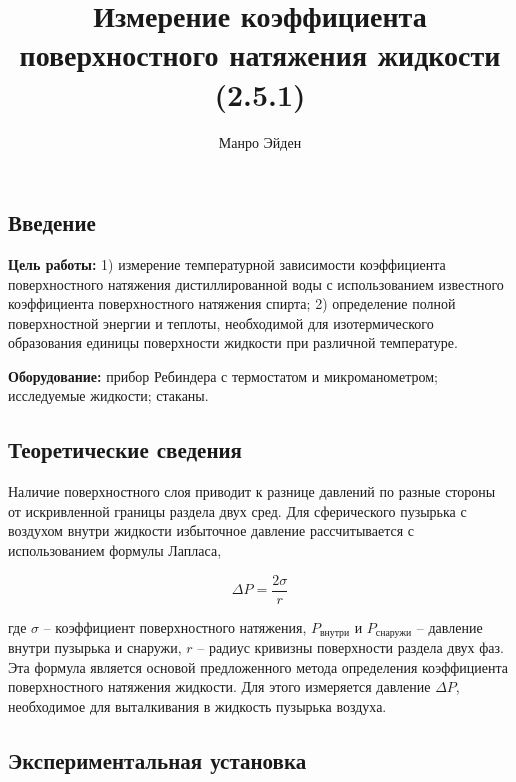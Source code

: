\documentclass[a4paper, 12pt]{article}
\title{\textbf{Измерение коэффициента поверхностного натяжения жидкости (2.5.1)}}
\author{Манро Эйден}
\date{}
\begin{document}
\maketitle

\begin{center}
    \section*{Введение}
\end{center}

\noindent \textbf{Цель работы:} 1) измерение температурной зависимости  коэффициента поверхностного натяжения дистиллированной воды с использованием известного коэффициента поверхностного натяжения спирта; 2) определение полной поверхностной энергии  и теплоты, необходимой для изотермического образования единицы поверхности жидкости  при различной температуре.

\bigskip

\noindent \textbf{Оборудование:} прибор  Ребиндера  с термостатом и микроманометром; исследуемые жидкости; стаканы.

\bigskip

\begin{center}
    \subsection*{Теоретические сведения}
\end{center}

Наличие поверхностного слоя приводит к разнице давлений по разные стороны от искривленной границы раздела двух сред. 
Для сферического пузырька с воздухом внутри жидкости избыточное давление рассчитывается с использованием формулы Лапласа,

\begin{equation} \label{laplas}
    \Delta P = \frac{2\sigma}{r}
\end{equation}

где $\sigma$  – коэффициент поверхностного натяжения, $P_{\text{внутри}}$ и $P_{\text{снаружи}}$ – давление внутри пузырька и снаружи, $r$ – радиус кривизны поверхности раздела двух фаз. Эта формула является основой предложенного метода определения коэффициента поверхностного натяжения жидкости. Для этого измеряется давление $\varDelta P$, необходимое для выталкивания в жидкость пузырька воздуха.

\begin{center}
    \subsection*{Экспериментальная установка}
\end{center}
\end{document}
